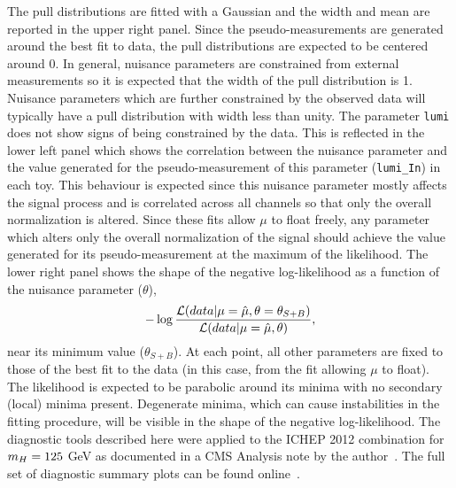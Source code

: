 The pull distributions are fitted with a Gaussian and the width and mean 
are reported in the upper right panel. Since the pseudo-measurements 
are generated around the best fit to data, the pull distributions
are expected to be centered around 0. In general, nuisance parameters
are constrained from external measurements so it is expected that the 
width of the pull distribution is 1. Nuisance parameters which are further
constrained by the observed data will typically have a pull distribution with width less
than unity. The parameter \texttt{lumi} does not show signs of being constrained
by the data. 
This is reflected in the lower left panel which shows the correlation between
the nuisance parameter and the value generated for the pseudo-measurement
of this parameter (\texttt{lumi\_In}) in each toy.
This behaviour is expected since this nuisance parameter mostly affects the signal process and 
is correlated across all channels so that only the overall
normalization is altered. Since these fits allow $\mu$ to float freely, 
any parameter which alters only the overall normalization of the signal should 
achieve the value generated for its pseudo-measurement at the maximum of the likelihood. 
The lower right panel shows the shape of the negative log-likelihood
as a function of the nuisance parameter ($\theta$),
\begin{equation}
-\log \frac{\displaystyle \mathcal{L}(data|\mu=\hat{\mu},\theta=\theta_{S+B})}
		 {\displaystyle \mathcal{L}(data|\mu=\hat{\mu},\theta)},
\end{equation}
near its minimum value ($\theta_{S+B}$).
At each point, all other parameters are fixed 
to those of the best fit to the data (in this case, from the fit allowing $\mu$ to float).
The likelihood is expected to be parabolic around its minima with no secondary (local) 
minima present.
Degenerate minima, which can cause instabilities in the fitting procedure, will be visible in the 
shape of the negative log-likelihood. The diagnostic tools described here were applied
to the ICHEP 2012 combination for $m_{H}=125$ GeV as documented in a CMS Analysis note by the 
author~\citep{AN-12-317}. 
The full set of diagnostic summary plots can be found online~\citep{onlinediag}.
